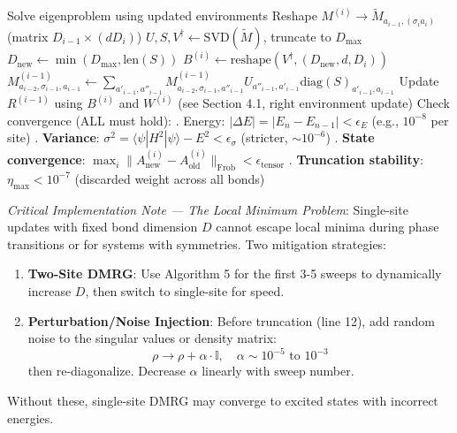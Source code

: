 \documentclass[aps,prb,onecolumn,scriptaddress]{revtex4-2}
\newcommand{\ket}[1]{|#1\rangle}
\newcommand{\bra}[1]{\langle#1|}
\newcommand{\eps}{\epsilon}
\begin{document}
\begin{algorithm}[H]
\begin{algorithmic}[1]
		\State Solve eigenproblem using updated environments
		\State Reshape $M^{(i)} \to \tilde{M}_{a_{i-1}, (\sigma_i a_i)}$ (matrix $D_{i-1} \times (dD_i)$)
		\State $U, S, V^\dagger \gets \text{SVD}(\tilde{M})$, truncate to $D_{\max}$
		\State $D_{\text{new}} \gets \min(D_{\max}, \text{len}(S))$ 
		\State $B^{(i)} \gets \text{reshape}(V^\dagger, (D_{\text{new}}, d, D_i))$ 
		\State {}
		\State $M^{(i-1)}_{a_{i-2},\sigma_{i-1},a_{i-1}} \gets \sum_{a'_{i-1}, a''_{i-1}} M^{(i-1)}_{a_{i-2},\sigma_{i-1},a''_{i-1}} U_{a''_{i-1},a'_{i-1}} \text{diag}(S)_{a'_{i-1},a_{i-1}}$
		\State Update $R^{(i-1)}$ using $B^{(i)}$ and $W^{(i)}$ (see Section 4.1, right environment update)
		\EndFor
		\State Check convergence (ALL must hold):
		\State {}. Energy: $|\Delta E| = |E_n - E_{n-1}| < \eps_E$ (e.g., $10^{-8}$ per site)
		\State {}. \textbf{Variance}: $\sigma^2 = \bra{\psi}H^2\ket{\psi} - E^2 < \eps_{\sigma}$ (stricter, $\sim 10^{-6}$)
		\State {}. \textbf{State convergence}: $\max_i \|A^{(i)}_{\text{new}} - A^{(i)}_{\text{old}}\|_{\text{Frob}} < \eps_{\text{tensor}}$
		\State {}. \textbf{Truncation stability}: $\eta_{\text{max}} < 10^{-7}$ (discarded weight across all bonds)
		\EndWhile
	\end{algorithmic}
\end{algorithm}

	\textit{Critical Implementation Note — The Local Minimum Problem}:
	Single-site updates with fixed bond dimension $D$ cannot escape local minima during phase transitions or for systems with symmetries. Two mitigation strategies:
	\begin{enumerate}
		\item \textbf{Two-Site DMRG}: Use Algorithm 5 for the first 3-5 sweeps to dynamically increase $D$, then switch to single-site for speed.
		\item \textbf{Perturbation/Noise Injection}: Before truncation (line 12), add random noise to the singular values or density matrix:
		\begin{equation}
			\rho \to \rho + \alpha \cdot \mathbb{I}, \quad \alpha \sim 10^{-5} \text{ to } 10^{-3}
		\end{equation}
		then re-diagonalize. Decrease $\alpha$ linearly with sweep number.
	\end{enumerate}
	Without these, single-site DMRG may converge to excited states with incorrect energies.
	
\end{document}
